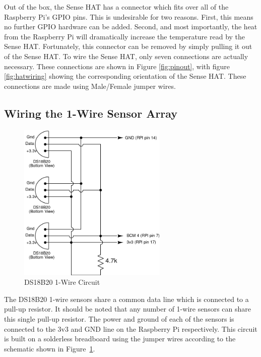 \documentclass[journal]{new-aiaa}
\begin{document}
Out of the box, the Sense HAT has a connector which fits over all of
the Raspberry Pi's GPIO pins.  This is undesirable for two reasons.
First, this means no further GPIO hardware can be added.  Second, and
most importantly, the heat from the Raspberry Pi will dramatically
increase the temperature read by the Sense HAT.  Fortunately, this
connector can be removed by simply pulling it out of the Sense HAT.
To wire the Sense HAT, only seven connections are actually necessary.
These connections are shown
in Figure \ref{fig:pinout}, with figure \ref{fig:hatwiring} showing
the corresponding orientation of the Sense HAT.  These connections are
made using Male/Female jumper wires.

\subsection{Wiring the 1-Wire Sensor Array}
\begin{figure}
    \centering
    \includegraphics[height=3.0in]{images/ds18b20-circuit}
    \caption{DS18B20 1-Wire Circuit}
    \label{fig:circuit}
\end{figure}
The DS18B20 1-wire sensors share a common data line which is connected
to a pull-up resistor.  It should be noted that any number of 1-wire
sensors can share this single pull-up resistor.  The power and ground
of each of the sensors is connected to the 3v3 and GND line on the Raspberry
Pi respectively.
This circuit is built on a solderless breadboard using the jumper
wires according to the schematic shown in Figure~\ref{fig:circuit}. 
\end{document}
